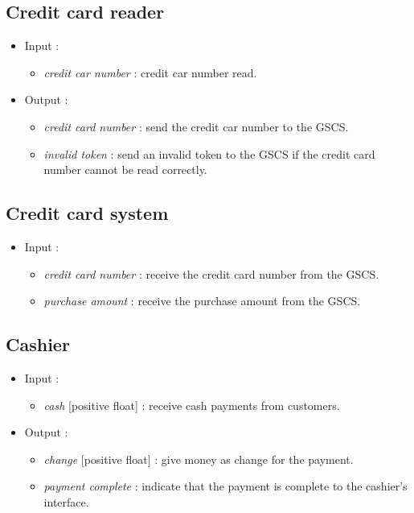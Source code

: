 \documentclass[11pt, a4paper]{article}
\newcommand{\data}[1]{\textit{#1}}
\begin{document}
\subsection{Credit card reader}

\begin{itemize}
\item Input :
		\begin{itemize}
		\item \data{credit car number} : credit car number read.
		\end{itemize}

\item Output :
		\begin{itemize}
		\item \data{credit card number} : send the credit car number to the GSCS.
		\item \data{invalid token} : send an invalid token to the GSCS if the credit card number cannot be read correctly.
		\end{itemize}
\end{itemize}



\subsection{Credit card system}

\begin{itemize}
\item Input :
		\begin{itemize}
		\item \data{credit card number} : receive the credit card number from the GSCS.
		\item \data{purchase amount} : receive the purchase amount from the GSCS.
		\end{itemize}
\end{itemize}



\subsection{Cashier}

\begin{itemize}
\item Input :
		\begin{itemize}
		\item \data{cash} [positive float] : receive cash payments from customers.
		\end{itemize}

\item Output :
		\begin{itemize}
		\item \data{change} [positive float] : give money as change for the payment.
		\item \data{payment complete} : indicate that the payment is complete to the cashier's interface.
		\end{itemize}
\end{itemize}
\end{document}
